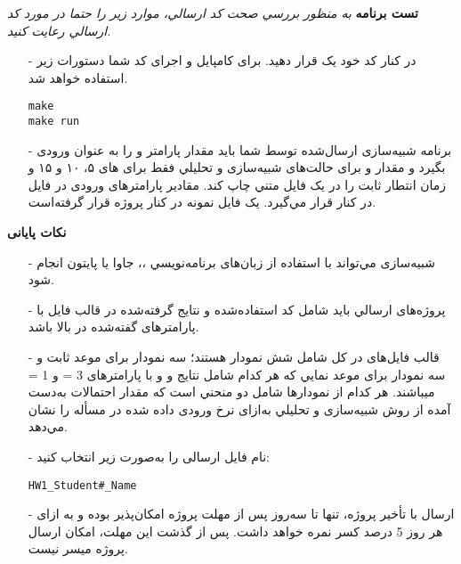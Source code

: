 \documentclass[12pt]{article}
\begin{document}
	\textbf{تست برنامه}
	\newline
    \textit{به منظور بررسي صحت کد ارسالي، موارد زیر را حتما در مورد کد ارسالي رعایت کنید.}
	\begin{itemize}
	\item[-]
در کنار کد خود یک  قرار دهید. برای کامپایل و اجرای کد شما دستورات زیر استفاده خواهد شد.
    \begin{latin}
		\texttt{make}\\
		\texttt{make run}
	\end{latin}
    \item[-]
    برنامه شبیه‌سازی ارسال‌شده توسط شما باید مقدار پارامتر \lr{$\theta$} و \lr{$\mu$} را به عنوان ورودی بگیرد و مقدار  و  برای حالت‌های
شبیه‌سازی و تحلیلي فقط برای \lr{$\lambda$} های ۵، ۱۰ و ۱۵ و زمان انتطار ثابت را در یک فایل متني چاپ کند. مقادیر پارامترهای ورودی در فایل  در کنار  قرار مي‌گیرد. یک فایل نمونه در کنار پروژه قرار گرفته‌است.
    \end{itemize}
    
    \newpage
    \textbf{نکات پایانی}
    \begin{itemize}
	\item[-]
	شبیه‌سازی مي‌تواند با استفاده از زبان‌های برنامه‌نویسي  ،، جاوا یا پایتون انجام شود.
	\item[-]
	پروژه‌های ارسالي باید شامل کد استفاده‌شده و نتایج گرفته‌شده در قالب فایل  با پارامترهای گفته‌شده در بالا
باشد.
    \item[-]
    قالب فایل‌های  در کل شامل شش نمودار هستند؛ سه نمودار برای موعد ثابت و سه نمودار برای موعد نمایي که هر
کدام شامل نتایج  و  و  با پارامترهای 3 = \lr{$\theta$} و 1 = \lr{$\mu$} ميباشند. هر کدام از نمودارها شامل دو منحني است که
مقدار احتمالات به‌دست آمده از روش شبیه‌سازی و تحلیلي به‌ازای نرخ ورودی داده شده در مسأله را نشان مي‌دهد.
    \item[-]	
	 نام فايل ارسالی را به‌صورت زير انتخاب كنيد:

\begin{latin} \begin{center}
		\texttt{HW1\_Student\#\_Name}
	\end{center}
\end{latin}

	\item[-]
	ارسال با تأخیر پروژه، تنها تا سه‌روز پس از مهلت پروژه امکان‌پذیر بوده و به ازای هر روز 5 درصد کسر نمره خواهد داشت. پس از گذشت این مهلت، امکان ارسال پروژه میسر نیست.
	\end{itemize}
	
\end{document}
